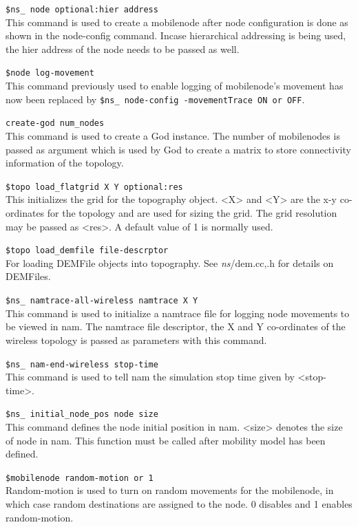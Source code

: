 \begin{flushleft}
{\tt \$ns\_ node \<optional:hier address\>}\\
This command is used to create a mobilenode after node configuration is done
as shown in the node-config command. Incase hierarchical addressing is being
used, the hier address of the node needs to be passed as well.


{\tt \$node log-movement}\\
This command previously used to enable logging of mobilenode's movement has now
been replaced by {\tt \$ns\_ node-config -movementTrace \<ON or OFF\>}.


{\tt create-god \<num\_nodes\>}\\
This command is used to create a God instance. The number of mobilenodes
is passed as argument which is used by God to create a matrix to store
connectivity information of the topology.


{\tt \$topo load\_flatgrid \<X\> \<Y\> \<optional:res\>}\\
This initializes the grid for the topography object. <X> and <Y> are the x-y
co-ordinates for the topology and are used for sizing the grid. The grid
resolution may be passed as <res>. A default value of 1 is normally used.


{\tt \$topo load\_demfile \<file-descrptor\>}\\
For loading DEMFile objects into topography. See \emph{ns}/dem.{cc,.h} for details on
DEMFiles.


{\tt \$ns\_ namtrace-all-wireless \<namtrace\> \<X\> \<Y\>}\\
This command is used to initialize a namtrace file for logging node movements
to be viewed in nam. The namtrace file descriptor, the X and Y 
co-ordinates of the wireless topology is passed as parameters with
this command.


{\tt \$ns\_ nam-end-wireless \<stop-time\>}\\
This command is used to tell nam the simulation stop time given by <stop-time>.


{\tt \$ns\_ initial\_node\_pos \<node\> \<size\>}\\
This command defines the node initial position in nam. <size> denotes the size
of node in nam. This function must be called after mobility model has been
defined.


{\tt \$mobilenode random-motion  or 1\>}\\
Random-motion is used to turn on random movements for the mobilenode, in which
case random destinations are assigned to the node. 0 disables and 1 enables
random-motion.



\end{flushleft}

